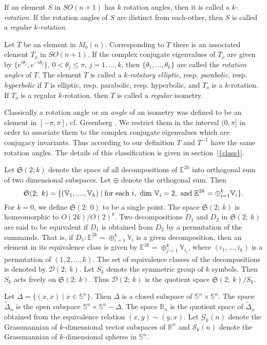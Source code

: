 \documentclass[11pt]{amsart}
\theoremstyle{definition}
\theoremstyle{remark}
\numberwithin{equation}{section}
\theoremstyle{plain}
\begin{document}
 If an element $S$ in $SO(n+1)$ has $k$ rotation angles, then it is called a \emph{$k$-rotation}. If the rotation angles of $S$ are distinct from each-other, then $S$ is called a \emph{regular $k$-rotation}. 

Let $T$ be an element in $M_o(n)$. Corresponding to $T$ there is an associated element $T_o$ in $SO(n+1)$. If the complex conjugate eigenvalues of $T_o$ are given by $\{e^{i\theta_j}, e^{-i\theta_j}\}$, $0 < \theta_j \leq \pi$, $j=1,...,k$, then $\{\theta_1,...,\theta_k\}$ are called the \emph{rotation angles} of $T$.  The element $T$ is called a \emph{$k$-rotatory elliptic}, resp. \emph{parabolic}, resp. \emph{ hyperbolic} if $T$ is elliptic, resp. parabolic, resp. hyperbolic, and $T_o$ is a $k$-rotation. If $T_o$ is a regular $k$-rotation, then $T$ is called a \emph{regular} isometry. 

 Classically a rotation angle or an \emph{angle} of an isometry was defined to be an element in $[-\pi, \pi]$, cf. Greenberg \cite{greenberg}. We restrict them in the interval $(0, \pi]$ in order to  associate them to the complex conjugate eigenvalues which are conjugacy invariants. Thus according to our definition $T$ and $T^{-1}$ have the same rotation angles. The details of this classification is given in {section~\ref{{class}}}.

Let $\mathfrak S(2;k)$ denote the space of all decompositions of ${\mathbb E}^{2k}$ into orthogonal sum of two dimensional subspaces. Let $\oplus$ denote the orthogonal sum. Then 
$$\mathfrak S(2; \ k)=\{({\mathbb V}_1,....,{\mathbb V}_k)\;|\;\hbox{for each }i,\hbox{ dim }{\mathbb V}_i=2, \hbox{ and} \;{\mathbb E}^{2k}=\oplus_{i=1}^k{\mathbb V}_i\}.$$
For $k=0$, we define $\mathfrak S(2; \ 0)$ to be a single point. The space $\mathfrak S(2; \ k)$ is homeomorphic to $O(2k)/O(2)^k$. 
Two decompositions $D_1$ and $D_2$ in $\mathfrak S(2; \ k)$ are said to be equivalent if $D_1$ is obtained from $D_2$ by a permutation of the summands. That is, if $D_1: {\mathbb E}^{2k}=\oplus_{i=1}^k {\mathbb V}_i$ is a given decomposition, then an element in its equivalence class is given by ${\mathbb E}^{2k}=\oplus_{j=1}^k {\mathbb V}_{i_j}$, where $(i_1,...,i_k)$ is a permutation of $(1,2,...,k)$. The set of equivalence classes of the decompositions is denoted by ${\mathcal D}(2; \ k)$. Let $S_k$ denote the symmetric group of $k$ symbols. Then $S_k$ acts freely on $\mathfrak S(2; \ k)$. Thus ${\mathcal D}(2; \ k)$ is the quotient space   $\mathfrak S(2; \ k)/S_k$. 

Let $\Delta=\{(x,x)\;|\;x \in {\mathbb S}^n\}$. Then $\Delta$ is a closed subspace of ${\mathbb S}^n \times {\mathbb S}^n$. The space $\tilde \Delta_n$ is the open subspace ${\mathbb S}^n \times {\mathbb S}^n-\Delta$. The space ${\mathbb B}_n$ is the quotient space of $\tilde \Delta_n$ obtained from the equivalence relation $(x,y) \sim (y,x)$. Let ${\mathcal G}_k(n)$ denote the Grassmannian of $k$-dimensional vector subspaces of ${\mathbb R}^n$ and $\mathcal S_k(n)$ denote the Grassmannian of $k$-dimensional spheres in ${\mathbb S}^n$. 
\end{document}
